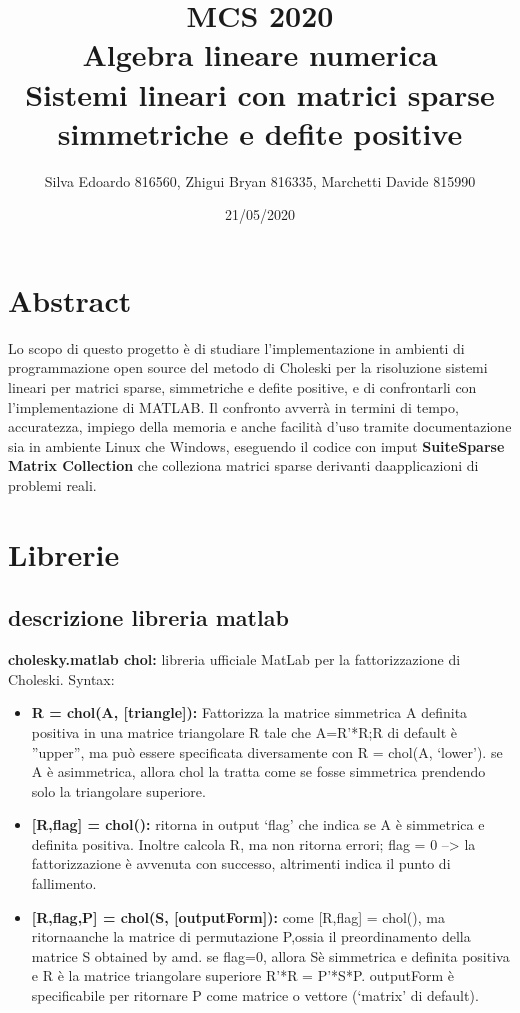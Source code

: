 \documentclass[12pt]{article}
\title{%
  MCS 2020 \\
  \large Algebra lineare numerica \\
  Sistemi lineari con matrici sparse simmetriche e defite positive}
\date{21/05/2020}
\author{Silva Edoardo 816560, Zhigui Bryan 816335, Marchetti Davide 815990}
\begin{document}
\maketitle

\section*{Abstract}

Lo scopo di questo progetto è di studiare l'implementazione in ambienti
di programmazione open source del metodo di Choleski per la risoluzione sistemi lineari
per matrici sparse, simmetriche e defite positive, e di confrontarli con l'implementazione
di MATLAB.\newline
Il confronto avverrà in termini di tempo, accuratezza, impiego della memoria e anche facilità d'uso tramite
documentazione sia in ambiente Linux che Windows, eseguendo il codice con imput \textbf{SuiteSparse Matrix Collection}
che colleziona matrici sparse derivanti daapplicazioni di problemi reali.\newline
\section{Librerie}
	\subsection{descrizione libreria matlab}
	
	\textbf{cholesky.matlab chol:} libreria ufficiale MatLab per la fattorizzazione di Choleski.	\newline
	 \large{Syntax:}
	\begin{itemize}
 		 \item \textbf{R = chol(A, [triangle]):} Fattorizza la matrice simmetrica A definita positiva in una matrice triangolare R tale che A=R'*R;\newline R di default è ''upper'', ma può essere specificata diversamente con R = chol(A, `lower'). se A è asimmetrica, allora chol la tratta come se fosse simmetrica prendendo solo la triangolare superiore.
 		 \item{\textbf{[R,flag] = chol():} ritorna in output `flag' che indica se A è simmetrica e definita positiva. Inoltre calcola R, ma non ritorna errori; flag = 0 --> la fattorizzazione è avvenuta con successo, altrimenti indica il punto di fallimento.}
 		 \item{\textbf{[R,flag,P] = chol(S, [outputForm]):}  come [R,flag] = chol(), ma ritornaanche la matrice di permutazione P,ossia il preordinamento della matrice S obtained by amd. se flag=0, allora  Sè simmetrica e definita positiva e R è la matrice triangolare superiore R'*R = P'*S*P.
 		 outputForm è specificabile per ritornare P come matrice o vettore (`matrix' di default).}
	\end{itemize}
\end{document}
